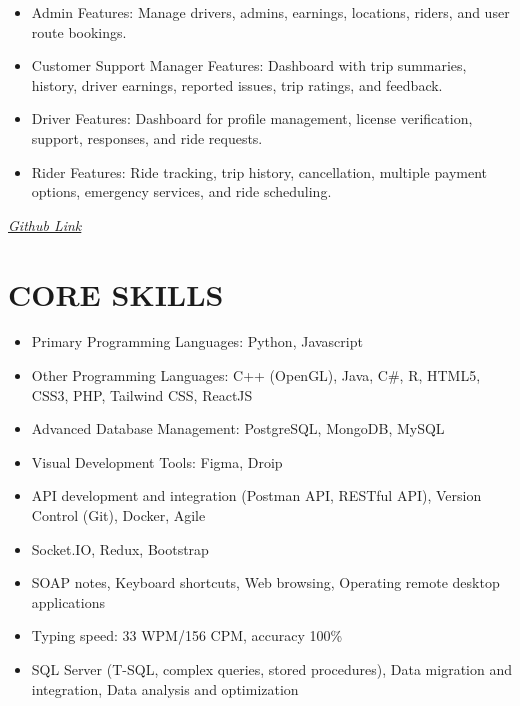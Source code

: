 \documentclass[a4paper,12pt]{article}
\begin{document}
\begin{itemize}
\begin{itemize}[label=--]
        \item Admin Features: Manage drivers, admins, earnings, locations, riders, and user route bookings.
    
        \item Customer Support Manager Features: Dashboard with trip summaries, history, driver earnings, reported issues, trip ratings, and feedback.
    
        \item Driver Features: Dashboard for profile management, license verification, support, responses, and ride requests.
    
        \item Rider Features: Ride tracking, trip history, cancellation, multiple payment options, emergency services, and ride scheduling.
        
    \end{itemize}

    \hfill \href{https://github.com/0Sa-ad0/web-tech}{\textit{Github Link}}

\end{itemize}

\section*{CORE SKILLS}
\begin{itemize}[label=-]
    \item Primary Programming Languages: Python, Javascript
    \item Other Programming Languages: C++ (OpenGL), Java, C\#, R, HTML5, CSS3, PHP, Tailwind CSS, ReactJS
    \item Advanced Database Management: PostgreSQL, MongoDB, MySQL
    \item Visual Development Tools: Figma, Droip
    \item API development and integration (Postman API, RESTful API), Version Control (Git), Docker, Agile
    \item Socket.IO, Redux, Bootstrap
    \item SOAP notes, Keyboard shortcuts, Web browsing, Operating remote desktop applications
    \item Typing speed: 33 WPM/156 CPM, accuracy 100\%
    \item SQL Server (T-SQL, complex queries, stored procedures), Data migration and integration, Data analysis and optimization
\end{itemize}
\end{document}
